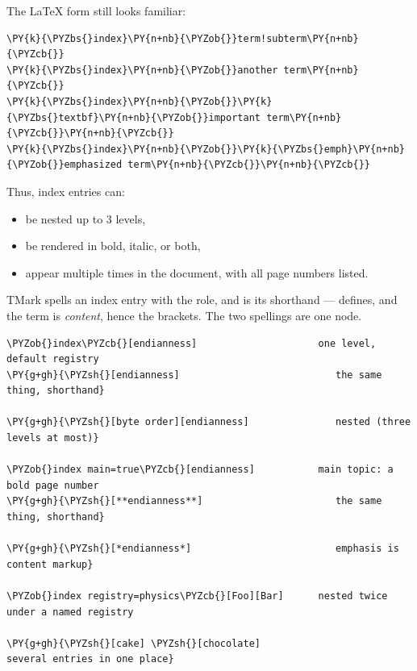 \documentclass[a4paper,twoside]{article}
\begin{document}
The \LaTeX{} form still looks familiar:
\begin{tscode}[lang=latex, engine=pygments]
\begin{Verbatim}[commandchars=\\\{\},breaklines, breakanywhere, commandchars=\\\{\}]
\PY{k}{\PYZbs{}index}\PY{n+nb}{\PYZob{}}term!subterm\PY{n+nb}{\PYZcb{}}
\PY{k}{\PYZbs{}index}\PY{n+nb}{\PYZob{}}another term\PY{n+nb}{\PYZcb{}}
\PY{k}{\PYZbs{}index}\PY{n+nb}{\PYZob{}}\PY{k}{\PYZbs{}textbf}\PY{n+nb}{\PYZob{}}important term\PY{n+nb}{\PYZcb{}}\PY{n+nb}{\PYZcb{}}
\PY{k}{\PYZbs{}index}\PY{n+nb}{\PYZob{}}\PY{k}{\PYZbs{}emph}\PY{n+nb}{\PYZob{}}emphasized term\PY{n+nb}{\PYZcb{}}\PY{n+nb}{\PYZcb{}}
\end{Verbatim}
\end{tscode}
Thus, index entries can:
\begin{itemize}
\item be nested up to 3 levels,
\item be rendered in bold, italic, or both,
\item appear multiple times in the document, with all page numbers listed.
\end{itemize}
TMark spells an index entry with the  role, and \tscodeinline{\#[…]} is its shorthand ---
\tscodeinline{\#} defines, and the term is \emph{content}, hence the brackets. The two spellings
are one node.
\begin{tscode}[lang=md, engine=pygments]
\begin{Verbatim}[commandchars=\\\{\},breaklines, breakanywhere, commandchars=\\\{\}]
\PYZob{}index\PYZcb{}[endianness]                     one level, default registry
\PY{g+gh}{\PYZsh{}[endianness]                           the same thing, shorthand}

\PY{g+gh}{\PYZsh{}[byte order][endianness]               nested (three levels at most)}

\PYZob{}index main=true\PYZcb{}[endianness]           main topic: a bold page number
\PY{g+gh}{\PYZsh{}[**endianness**]                       the same thing, shorthand}

\PY{g+gh}{\PYZsh{}[*endianness*]                         emphasis is content markup}

\PYZob{}index registry=physics\PYZcb{}[Foo][Bar]      nested twice under a named registry

\PY{g+gh}{\PYZsh{}[cake] \PYZsh{}[chocolate]                    several entries in one place}
\end{Verbatim}
\end{tscode}
\end{document}
